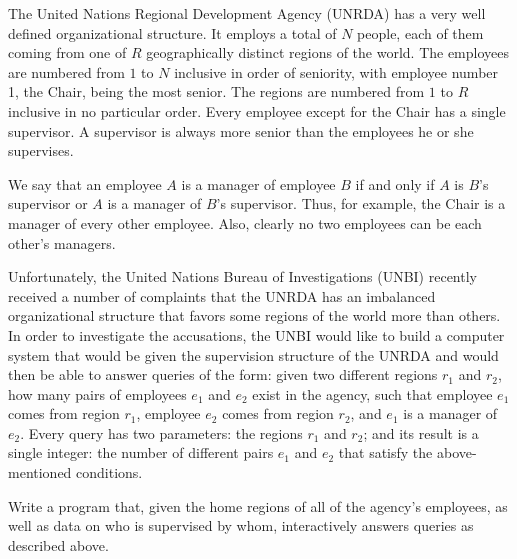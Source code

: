 The United Nations Regional Development Agency (UNRDA) has a very well defined
organizational structure. It employs a total of $N$ people, each of them coming from one of $R$ geographically distinct regions of the world. The employees are numbered from $1$ to $N$ inclusive in order of seniority, with employee number 1, the Chair, being the most senior. The regions are numbered from $1$ to $R$ inclusive in no particular order. Every employee except for the Chair has a single supervisor. A supervisor is always more senior than the employees he or she supervises. 

We say that an employee $A$ is a manager of employee $B$ if and only if $A$ is $B$'s supervisor or $A$ is a manager of $B$'s supervisor. Thus, for example, the Chair is a manager of every other employee. Also, clearly no two employees can be each other's managers. 

Unfortunately, the United Nations Bureau of Investigations (UNBI) recently received a number of complaints that the UNRDA has an imbalanced organizational structure that favors some regions of the world more than others. In order to investigate the accusations, the UNBI would like to build a computer system that would be given the supervision structure of the UNRDA and would then be able to answer queries of the form: given two different regions $r_1$ and $r_2$, how many pairs of employees $e_1$ and $e_2$ exist in the agency, such that employee $e_1$ comes from region $r_1$, employee $e_2$ comes from region $r_2$, and $e_1$ is a manager of $e_2$. Every query has two parameters: the regions $r_1$ and $r_2$; and its result is a single integer: the number of different pairs $e_1$ and $e_2$ that satisfy the above-mentioned conditions.


Write a program that, given the home regions of all of the agency's employees, as well as data on who is supervised by whom, interactively answers queries as described above.